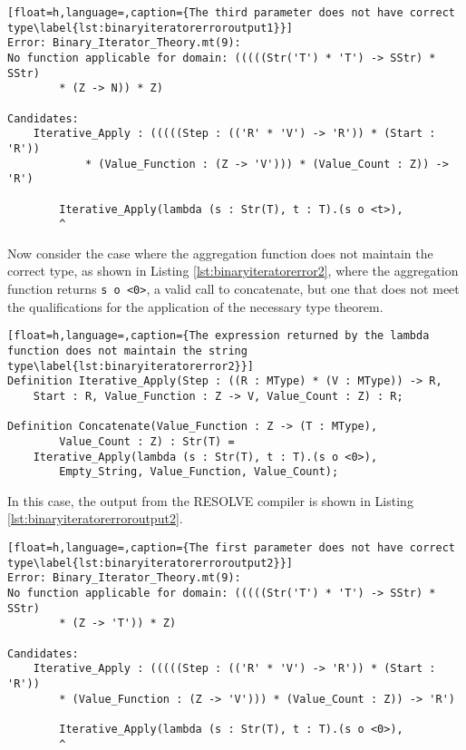 \begin{lstlisting}[float=h,language=,caption={The third parameter does not have correct type\label{lst:binaryiteratorerroroutput1}}]
Error: Binary_Iterator_Theory.mt(9):
No function applicable for domain: (((((Str('T') * 'T') -> SStr) * SStr) 
		* (Z -> N)) * Z)

Candidates:
	Iterative_Apply : (((((Step : (('R' * 'V') -> 'R')) * (Start : 'R'))
			* (Value_Function : (Z -> 'V'))) * (Value_Count : Z)) -> 'R')

		Iterative_Apply(lambda (s : Str(T), t : T).(s o <t>),
		^
\end{lstlisting}

Now consider the case where the aggregation function does not maintain the correct type, as shown in Listing \ref{lst:binaryiteratorerror2}, where the aggregation function returns \texttt{s o <0>}, a valid call to concatenate, but one that does not meet the qualifications for the application of the necessary type theorem.  

\begin{lstlisting}[float=h,language=,caption={The expression returned by the lambda function does not maintain the string type\label{lst:binaryiteratorerror2}}]
Definition Iterative_Apply(Step : ((R : MType) * (V : MType)) -> R,
	Start : R, Value_Function : Z -> V, Value_Count : Z) : R;

Definition Concatenate(Value_Function : Z -> (T : MType), 
		Value_Count : Z) : Str(T) = 
	Iterative_Apply(lambda (s : Str(T), t : T).(s o <0>),
		Empty_String, Value_Function, Value_Count);
\end{lstlisting}

In this case, the output from the RESOLVE compiler is shown in Listing \ref{lst:binaryiteratorerroroutput2}.

\begin{lstlisting}[float=h,language=,caption={The first parameter does not have correct type\label{lst:binaryiteratorerroroutput2}}]
Error: Binary_Iterator_Theory.mt(9):
No function applicable for domain: (((((Str('T') * 'T') -> SStr) * SStr) 
		* (Z -> 'T')) * Z)

Candidates:
	Iterative_Apply : (((((Step : (('R' * 'V') -> 'R')) * (Start : 'R')) 
		* (Value_Function : (Z -> 'V'))) * (Value_Count : Z)) -> 'R')

		Iterative_Apply(lambda (s : Str(T), t : T).(s o <0>),
		^
\end{lstlisting}


